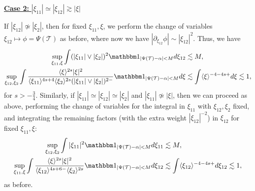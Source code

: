 \documentclass[%
11pt,  reqno]{amsart}
\newcommand{\5}{\textup{V}}
\newcommand{\noi}{\noindent}
\newcommand{\ind}{\mathbbm 1}
\newcommand{\les}{\lesssim}
\theoremstyle{remark}
\newcommand{\TT}{\mathcal{T}}
\newcommand{\al}{\alpha}
\newcommand{\ges}{\gtrsim}
\newcommand{\jb}[1]
{\langle #1 \rangle}
\numberwithin{equation}{section}
\numberwithin{theorem}{section}
\begin{document}
\smallskip
\noi
\underline{\textbf{Case 2:} $|\xi_{11}| \simeq |\xi_{12}| \ges |\xi|$}

If $|\xi_{12}| \not \simeq |\xi_2|$, then for fixed $\xi_{11}, \xi$, we perform the change of variables $\xi_{12} \mapsto \phi = \Psi(\TT)$ as before, where now we have $|\partial_{\xi_{12}} \phi | \sim |\xi_{12}|^2$. Thus, we have 
\begin{align}
    \sup_{\xi_{11}, \xi} \int 
(|\xi_{11}| \lor |\xi_2|)^2 \ind_{|\Psi(\TT) - \al| < M } d \xi_{12}
    &
    \les M
    , 
    \\
    \sup_{\xi_{12}, \xi_2} 
    \int 
    \frac{\jb{\xi}^{2s} |\xi|^2 }{\jb{\xi_{11}}^{4s+4} \jb{\xi_2}^{2s} (|\xi_{11}| \lor |\xi_2|)^{2-}} \ind_{|\Psi(\TT) - \al| < M } 
    d\xi
    &
    \les \int \jb{\xi}^{-4-4s+} d\xi \les 1 , 
\end{align}
for $s>-\frac34$.  
Similarly, 
if $|\xi_{11}|\simeq |\xi_{12}| \simeq |\xi_2|$ and $|\xi_{11}| \not \simeq |\xi|$, then we can proceed as above, performing the change of variables for the integral in $\xi_{11}$ with $\xi_{12},\xi_2$ fixed, and integrating the remaining factors (with the extra weight $|\xi_{12}|^{-2}$) in $\xi_{12}$ for fixed $\xi_{11},\xi$:
\begin{align}
    \sup_{\xi_{12}, \xi_2} \int |\xi_{11}|^2 \ind_{|\Psi(\TT) - \al| < M } d\xi_{11} 
    & \les M 
    ,
    \\
    \sup_{\xi_{11}, \xi} \int \frac{\jb{\xi}^{2s} |\xi|^2 }{\jb{\xi_{12}}^{4s+6 -} \jb{\xi_2}^{2s}} \ind_{|\Psi(\TT) - \al| < M } d\xi_{12 } 
    &
    \les 
    \int \jb{\xi_{12}}^{-4-4s+} d\xi_{12} \les 1, 
\end{align}
as before.
\end{document}
